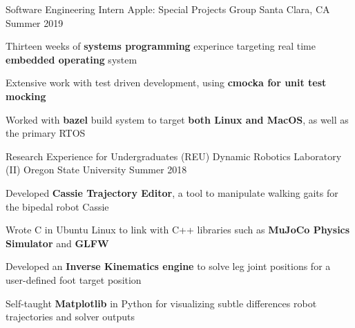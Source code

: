 

\begin{cventries}

  
  \cventry
    {Software Engineering Intern} %
    {Apple: Special Projects Group} %
    {Santa Clara, CA} %
    {Summer 2019} %
    {
      \begin{cvitems} %
      \item {Thirteen weeks of \textbf{systems programming} experince targeting real time \textbf{embedded operating} system}
      \item {Extensive work with test driven development, using \textbf{cmocka for unit test mocking}}
      \item {Worked with \textbf{bazel} build system to target \textbf{both Linux and MacOS}, as well as the primary RTOS}
      \end{cvitems}
    }

  


  \cventry
    {Research Experience for Undergraduates (REU)} %
    {Dynamic Robotics Laboratory (II)} %
    {Oregon State University} %
    {Summer 2018} %
    {
      \begin{cvitems} %
        \item {Developed \textbf{Cassie Trajectory Editor}, a tool to manipulate walking gaits for the bipedal robot Cassie}
        \item {Wrote C in Ubuntu Linux to link with C++ libraries such as \textbf{MuJoCo Physics Simulator} and \textbf{GLFW}}
        \item {Developed an \textbf{Inverse Kinematics engine} to solve leg joint positions for a user-defined foot target position}
        \item {Self-taught \textbf{Matplotlib} in Python for visualizing subtle differences robot trajectories and solver outputs}
      \end{cvitems}
    }
  



\end{cventries}
